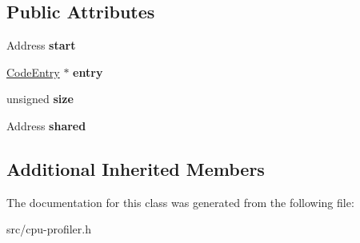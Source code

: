 \subsection*{Public Attributes}
\begin{DoxyCompactItemize}
\item 
\hypertarget{classv8_1_1internal_1_1_code_create_event_record_af06d7e7b3f1a499b439eab478c1a9f83}{}Address {\bfseries start}\label{classv8_1_1internal_1_1_code_create_event_record_af06d7e7b3f1a499b439eab478c1a9f83}

\item 
\hypertarget{classv8_1_1internal_1_1_code_create_event_record_a958cee637aef8a57947e19850e8e75c9}{}\hyperlink{classv8_1_1internal_1_1_code_entry}{Code\+Entry} $\ast$ {\bfseries entry}\label{classv8_1_1internal_1_1_code_create_event_record_a958cee637aef8a57947e19850e8e75c9}

\item 
\hypertarget{classv8_1_1internal_1_1_code_create_event_record_a5135428e86169e1ec2e2a9dc4572e547}{}unsigned {\bfseries size}\label{classv8_1_1internal_1_1_code_create_event_record_a5135428e86169e1ec2e2a9dc4572e547}

\item 
\hypertarget{classv8_1_1internal_1_1_code_create_event_record_a4cf476baf61c7777d850c78d8b77d74e}{}Address {\bfseries shared}\label{classv8_1_1internal_1_1_code_create_event_record_a4cf476baf61c7777d850c78d8b77d74e}

\end{DoxyCompactItemize}
\subsection*{Additional Inherited Members}


The documentation for this class was generated from the following file\+:\begin{DoxyCompactItemize}
\item 
src/cpu-\/profiler.\+h\end{DoxyCompactItemize}
